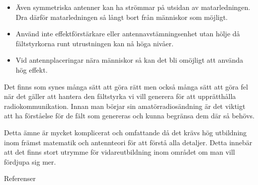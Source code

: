 \begin{itemize}
\item Även symmetriska antenner kan ha strömmar på utsidan av matarledningen.
  Dra därför matarledningen så långt bort från människor som möjligt.

\item Använd inte effektförstärkare eller antennavstämningsenhet utan
  hölje då fältstyrkorna runt utrustningen kan nå höga nivåer.

\item Vid antennplaceringar nära människor så kan det bli omöjligt att
  använda hög effekt.
\end{itemize}

Det finns som synes många sätt att göra rätt men också många sätt att göra fel
när det gäller att hantera den fältstyrka vi vill generera för att upprätthålla
radiokommunikation.
Innan man börjar sin amatörradiosändning är det viktigt att ha förståelse för
de fält som genereras och kunna begränsa dem där så behövs.

Detta ämne är mycket komplicerat och omfattande då det krävs hög
utbildning inom främst matematik och antennteori för att förstå alla detaljer.
Detta innebär att det finns stort utrymme för vidareutbildning inom området om
man vill fördjupa sig mer.

Referenser \cite{1999/519/EG} \cite{SSMFS2008:18} \cite{OETbul65b}
